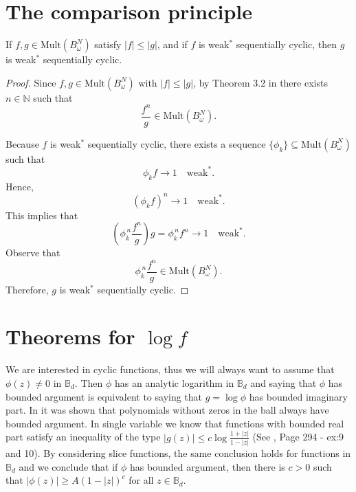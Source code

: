 \documentclass{article}
\numberwithin{equation}{section}
\newcommand{\Bd}{\mathbb B_d}
\begin{document}
\section{The comparison principle}
 \begin{thm}\label{thm:f less than g}
If $f, g \in \mathrm{Mult}(B^{N}_{\omega})$ satisfy $|f| \leq |g|$, and if $f$ is weak$^\ast$ sequentially cyclic, then $g$ is weak$^\ast$ sequentially cyclic.
\end{thm}

\begin{proof}
Since $f, g \in \mathrm{Mult}(B^{N}_{\omega})$ with $|f| \leq |g|$, by Theorem 3.2 in \cite{AlemanPerfektRichterSundbergSunkes2023} there exists $n \in \mathbb{N}$ such that
\[
\frac{f^{n}}{g} \in \mathrm{Mult}(B^{N}_{\omega}).
\]

Because $f$ is weak$^\ast$ sequentially cyclic, there exists a sequence $\{\phi_{k}\} \subseteq  \mathrm{Mult}(B^{N}_{\omega})$ such that
\[
\phi_{k} f \to 1
\quad \text{weak}^\ast.
\]
Hence,
\[
(\phi_{k} f)^{n} \to 1
\quad \text{weak}^\ast.
\]
This implies that
\[
\left( \phi_{k}^{\,n} \frac{f^{n}}{g} \right) g
=
\phi_{k}^{\,n} f^{n}
\to 1
\quad \text{weak}^\ast.
\]
Observe that
\[
\phi_{k}^{\,n} \frac{f^{n}}{g}
\in \mathrm{Mult}(B^{N}_{\omega}).
\]
Therefore, $g$ is weak$^\ast$ sequentially cyclic.
\end{proof}

\section{Theorems for \texorpdfstring{$\log f$}{log f}}
We are interested in cyclic functions, thus we will always want to assume that $\phi(z)\ne 0$ in $\Bd$. Then $\phi$ has an analytic logarithm in $\Bd$ and saying that  $\phi$ has bounded argument is equivalent to saying that $g=\log \phi$ has bounded imaginary part. In \cite{Richteriteratedlog} it was shown that polynomials without zeros in the ball always have bounded argument. In single variable we know that functions with bounded real part satisfy an inequality of the type $|g(z)|\le c\log\frac{1+|z|}{1-|z|}$ (See \cite{Rudinbookrealandcomplex}, Page 294 - ex:9 and 10). By considering slice functions, the same conclusion holds for functions in $\Bd$ and we conclude that if $\phi$ has bounded argument, then there is $c>0$ such that  $|\phi(z)|\ge A {(1-|z|)^c}$ for all $z\in \Bd$. 
\end{document}
